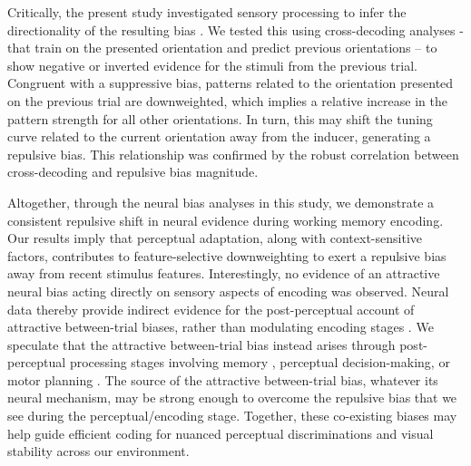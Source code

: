 \documentclass{article}
\begin{document}
Critically, the present study investigated sensory processing to infer the directionality of the resulting bias \parencite{Wolff2020}. We tested this using cross-decoding analyses - that train on the presented orientation and predict previous orientations – to show negative or inverted evidence for the stimuli from the previous trial. Congruent with a suppressive bias, patterns related to the orientation presented on the previous trial are downweighted, which implies a relative increase in the pattern strength for all other orientations. In turn, this may shift the tuning curve related to the current orientation away from the inducer, generating a repulsive bias. This relationship was confirmed by the robust correlation between cross-decoding and repulsive bias magnitude.

Altogether, through the neural bias analyses in this study, we demonstrate a consistent repulsive shift in neural evidence during working memory encoding. Our results imply that perceptual adaptation, along with context-sensitive factors, contributes to feature-selective downweighting to exert a repulsive bias away from recent stimulus features. Interestingly, no evidence of an attractive neural bias acting directly on sensory aspects of encoding was observed. Neural data thereby provide indirect evidence for the post-perceptual account of attractive between-trial biases, rather than modulating encoding stages \parencite{Fritsche2017, Bliss2017, Bae2020, Kim2020, Pascucci2019}. We speculate that the attractive between-trial bias instead arises through post-perceptual processing stages involving memory \parencite{Fritsche2017, Bliss2017}, perceptual decision-making, or motor planning \parencite{Machado2021, Sadil2021, Boettcher2021} . The source of the attractive between-trial bias, whatever its neural mechanism, may be strong enough to overcome the repulsive bias that we see during the perceptual/encoding stage. Together, these co-existing biases may help guide efficient coding for nuanced perceptual discriminations and visual stability across our environment.  
\end{document}
